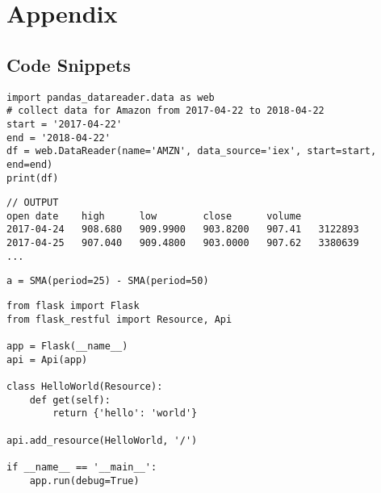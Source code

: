 %
\chapter{Appendix}
\label{sec:appendix}

\section{Code Snippets}
\label{sec:appendix:code_snippets}

\begin{code}
\label{code:rel:dev_lib:pandas:amz_data}
\begin{verbatim}
import pandas_datareader.data as web
# collect data for Amazon from 2017-04-22 to 2018-04-22
start = '2017-04-22'
end = '2018-04-22'
df = web.DataReader(name='AMZN', data_source='iex', start=start, end=end)
print(df)
\end{verbatim}
\begin{verbatim}
// OUTPUT
open date    high      low        close      volume
2017-04-24   908.680   909.9900   903.8200   907.41   3122893
2017-04-25   907.040   909.4800   903.0000   907.62   3380639
...
\end{verbatim}
\end{code}

\begin{code}
\label{code:rel:dev_lib:backtrader:sma_diff}
\begin{verbatim}
a = SMA(period=25) - SMA(period=50)
\end{verbatim}
\end{code}


\begin{code}
\label{code:rel:dev_lib:flask:flask_restful}
\begin{verbatim}
from flask import Flask
from flask_restful import Resource, Api

app = Flask(__name__)
api = Api(app)

class HelloWorld(Resource):
    def get(self):
        return {'hello': 'world'}

api.add_resource(HelloWorld, '/')

if __name__ == '__main__':
    app.run(debug=True)
\end{verbatim}
\end{code}


\newpage
